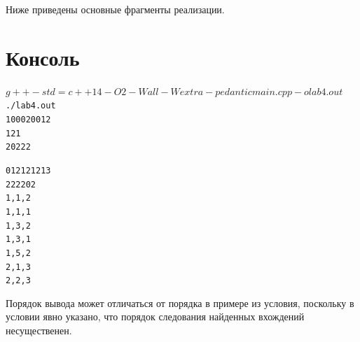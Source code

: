 Ниже приведены основные фрагменты реализации.










\pagebreak

\section{Консоль}
\begin{alltt}
$ g++ -std=c++14 -O2 -Wall -Wextra -pedantic main.cpp -o lab4.out
$ ./lab4.out
1 0002 001 2
1 2 1
2 02 2 2

01 2 1 2   1 2 1 3
2 2 2 2 02
1, 1, 2
1, 1, 1
1, 3, 2
1, 3, 1
1, 5, 2
2, 1, 3
2, 2, 3
\end{alltt}

Порядок вывода может отличаться от порядка в примере из условия, поскольку в условии явно указано,
что порядок следования найденных вхождений несущественен.
\pagebreak
